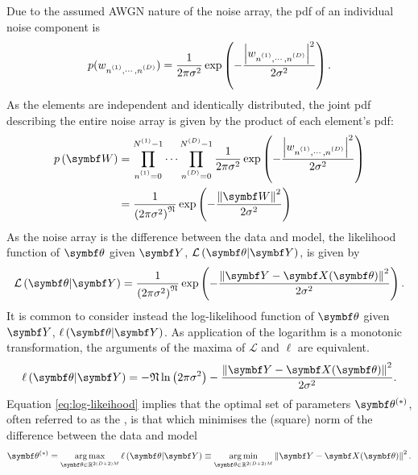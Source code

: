 Due to the assumed \ac{AWGN} nature of the noise array, the \ac{pdf} of an
individual noise component is
\begin{equation}
    p(\wnonenD) =
        \frac{1}{2\pi \sigma^2}
        \exp\left( -\frac{\left\lvert \wnonenD \right\rvert^2}{2\sigma^2}\right).
\end{equation}
As the elements are independent and identically distributed, the joint \ac{pdf}
describing the entire noise array is given by the product of each element's
\ac{pdf}:
\begin{equation}
    \begin{split}
        p\left(\bW\right) &=
            \prod_{\none=0}^{\None - 1}
            \cdots
            \prod_{\nD=0}^{\ND - 1}
            \frac{1}{2\pi \sigma^2}
            \exp\left(
                -\frac
                {\left\lvert \wnonenD \right\rvert^2}
                {2\sigma^2}\right) \\
            &= \frac{1}{\left(2\pi \sigma^2\right)^{\mathfrak{N}}}
            \exp\left( -\frac{\left\lVert \bW \right\rVert^2}{2\sigma^2}\right)
    \end{split}
\end{equation}
As the noise array is the difference between the data and model, the
likelihood function of $\bth$ given $\bY$, $\mathcal{L}\left(\bth \vert
\bY\right)$, is given by
\begin{equation}
    \mathcal{L}\left(\bth \vert \bY\right) =
    \frac{1}{\left(2\pi \sigma^2\right)^{\mathfrak{N}}}
        \exp\left( -\frac{\left\lVert \bY - \bX(\bth) \right\rVert^2}{2\sigma^2}\right).
\end{equation}
It is common to consider instead the log-likelihood function of $\bth$ given
$\bY$, $\ell\left(\bth \vert \bY\right)$. As application of the logarithm is a
monotonic transformation, the arguments of the maxima of $\mathcal{L}$ and
$\ell$ are equivalent.
\begin{equation}
    \ell\left(\bth \vert \bY\right) =
        -\mathfrak{N} \ln\left(2 \pi \sigma^2\right)
        -\frac{\left\lVert \bY - \bX(\bth) \right\rVert^2}{2\sigma^2}.
    \label{eq:log-likeihood}
\end{equation}
Equation \ref{eq:log-likeihood} implies that the optimal set of parameters
$\bth^{(*)}$, often referred to as the ,
is that which minimises the
(square) norm of the difference between the data and model
\begin{equation}
    \bthstar = \argmax_{\bth \in \mathbb{R}^{2(D+2)M}}
        \ell\left(\bth \vert \bY\right) \equiv
        \argmin_{\bth \in \mathbb{R}^{2(D+2)M}} \left\lVert \bY - \bX(\bth) \right\rVert^2.
    \label{eq:argmin_y-x}
\end{equation}
